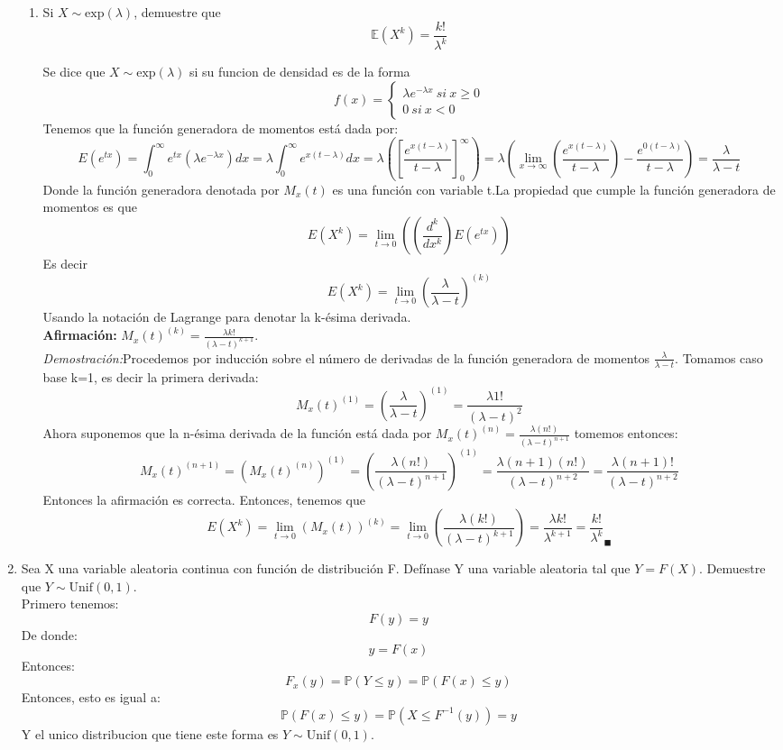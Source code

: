 \documentclass[11pt,a4paper]{report}
\begin{document}
\begin{enumerate}
{\begin{enumerate}
				\item {
					Si $X \sim \text{exp}(\lambda)$, demuestre que
                        $$ \mathbb{E}(X^k) = \frac{k!}{\lambda^k} $$

                        Se dice que $X \sim \text{exp}(\lambda)$ si su funcion de densidad es de la forma $$f(x)= 	\begin{cases}
		\lambda e^{-\lambda x} \ si \ x\geq 0 \\
		0 \ si \ x<0
	\end{cases}$$ Tenemos que la función generadora de momentos está dada por: $$E(e^{tx})=\int_{0}^{\infty}e^{tx}(\lambda e^{-\lambda x}) dx=\lambda \int_{0}^{\infty}e^{x(t-\lambda)}dx=\lambda ([\frac{e^{x(t-\lambda)}}{t-\lambda}]_{0}^{\infty})=\lambda (\lim_{x\rightarrow \infty} (\frac{e^{x(t-\lambda)}}{t-\lambda})-\frac{e^{0(t-\lambda)}}{t-\lambda})=\frac{\lambda}{\lambda-t}$$
	Donde la función generadora denotada por $M_{x}(t)$ es una función con variable t.La propiedad que cumple la función generadora de momentos es que $$E(X^{k})=\lim_{t\rightarrow 0}( (\frac{d^{k}}{dx^{k}}) E(e^{tx}))$$ Es decir
	$$E(X^{k})=\lim_{t\rightarrow 0}(\frac{\lambda}{\lambda-t})^{(k)}$$ Usando la notación de Lagrange para denotar la k-ésima derivada. \\
	\textbf{Afirmación:} $M_{x}(t)^{(k)}=\frac{\lambda k!}{(\lambda-t)^{k+1}}$. \\
	\textit{Demostración:}Procedemos por inducción sobre el número de derivadas de la función generadora de momentos $\frac{\lambda}{\lambda-t}$. Tomamos caso base k=1, es decir la primera derivada:
	$$M_{x}(t)^{(1)}=(\frac{\lambda}{\lambda-t})^{(1)}=\frac{\lambda 1!}{(\lambda-t)^2}$$ Ahora suponemos que la n-ésima derivada de la función está dada por $M_{x}(t)^{(n)}=\frac{\lambda(n!)}{(\lambda-t)^{n+1}}$ tomemos entonces:
	$$M_{x}(t)^{(n+1)}=(M_{x}(t)^{(n)})^{(1)}=(\frac{\lambda (n!)}{(\lambda-t)^{n+1}})^{(1)}=\frac{\lambda (n+1)(n!)}{(\lambda-t)^{n+2}}=\frac{\lambda (n+1)!}{(\lambda-t)^{n+2}}$$ Entonces la afirmación es correcta. Entonces, tenemos que $$E(X^{k})=\lim_{t\rightarrow 0}(M_{x}(t))^{(k)}=\lim_{t \rightarrow 0}(\frac{\lambda(k!)}{(\lambda-t)^{k+1}})=\frac{\lambda k!}{\lambda^{k+1}}=\frac{k!}{\lambda^{k}}_{\blacksquare}$$
				}

			\end{enumerate}
		}

		\item{
			Sea X una variable aleatoria continua con función de distribución F.
            Defínase Y una variable aleatoria tal que $Y = F(X)$. Demuestre que
            $Y \sim \text{Unif}(0,1)$.
            \\
            Primero tenemos:
            \[F(y) = y\]
            De donde:
            \[y = F(x)\]
            Entonces:
            \[F_{x}(y) = \mathbb{P}(Y \leq y) = \mathbb{P}(F(x) \leq y)\]
            Entonces, esto es igual a:
            \[\mathbb{P}(F(x) \leq y) = \mathbb{P}(X \leq F^{-1}(y)) = y\]
            Y el unico distribucion que tiene este forma es $Y \sim \text{Unif}(0,1)$.


}
\end{enumerate}
\end{document}
